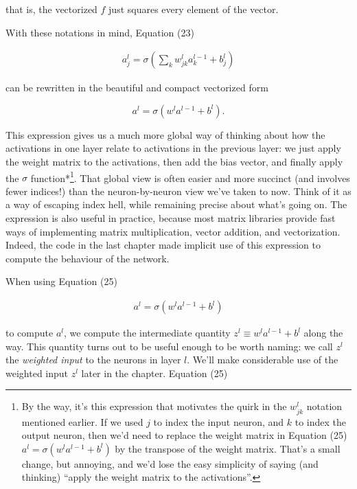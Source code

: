 \noindent that is, the vectorized $f$ just squares every element of the vector.


With these notations in mind, Equation (23)

\begin{align*}
a^{l}_j = \sigma\left( \sum_k w^{l}_{jk} a^{l-1}_k + b^l_j \right) \nonumber
\end{align*}

\noindent can be rewritten in the beautiful and compact vectorized form

\begin{equation}
a^{l} = \sigma(w^l a^{l-1}+b^l).
\tag{25}
\end{equation}

\noindent This expression gives us a much more global way of thinking about how the activations in one layer relate to activations in the previous layer: we just apply the weight matrix to the activations, then add the bias vector, and finally apply the $\sigma$ function*\footnote{By the way, it's this expression that motivates the quirk in the $w^l_{jk}$ notation mentioned earlier. If we used $j$ to index the input neuron, and $k$ to index the output neuron, then we'd need to replace the weight matrix in Equation (25)$a^{l} = \sigma(w^l a^{l-1}+b^l)$ by the transpose of the weight matrix. That's a small change, but annoying, and we'd lose the easy simplicity of saying (and thinking) ``apply the weight matrix to the activations''.}. That global view is often easier and more succinct (and involves fewer indices!) than the neuron-by-neuron view we've taken to now. Think of it as a way of escaping index hell, while remaining precise about what's going on. The expression is also useful in practice, because most matrix libraries provide fast ways of implementing matrix multiplication, vector addition, and vectorization. Indeed, the code in the last chapter made implicit use of this expression to compute the behaviour of the network.


When using Equation (25)

\begin{align*}
a^{l} = \sigma(w^l a^{l-1}+b^l) \nonumber
\end{align*}

\noindent to compute $a^l$, we compute the intermediate quantity $z^l \equiv w^l a^{l-1}+b^l$ along the way. This quantity turns out to be useful enough to be worth naming: we call $z^l$ the \emph{weighted input} to the neurons in layer $l$. We'll make considerable use of the weighted input $z^l$ later in the chapter. Equation (25)

